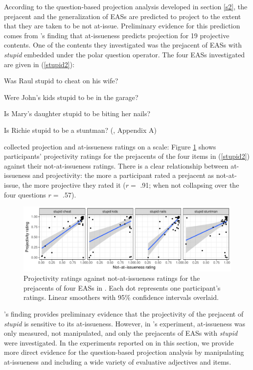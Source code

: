 \documentclass[11pt,fleqn]{article}
\newcommand{\6}{\mbox{$[\hspace*{-.6mm}[$}}
\newcommand{\9}{\mbox{$]\hspace*{-.6mm}]$}}
\newcommand{\citepos}[1]{\citeauthor{#1}'s \citeyear{#1}}
\begin{document}
According to the question-based projection analysis developed in section \ref{s2}, the prejacent and the generalization of EASs are predicted to project to the extent that they are taken to be not at-issue. Preliminary evidence for this prediction comes from \citepos{tbd-variability} finding that at-issueness predicts projection for 19 projective contents. One of the contents they investigated was the prejacent of EASs with {\em stupid} embedded under the polar question operator. The four EASs investigated are given in (\ref{stupid2}):

\begin{exe}
\ex\label{stupid2}

\begin{xlist}

\ex Was Raul stupid to cheat on his wife?

\ex Were John's kids stupid to be in the garage?

\ex Is Mary's daughter stupid to be biting her nails?

\ex Is Richie stupid to be a stuntman? \hfill (\citealt{tbd-variability}, Appendix A)

\end{xlist}

\end{exe}
\citet{tbd-variability} collected projection and at-issueness ratings on a scale: Figure \ref{f-corr} shows participants' projectivity ratings for the prejacents of the four items in (\ref{stupid2}) against their not-at-issueness ratings. There is a clear relationship between at-issueness and projectivity: the more a participant rated a prejacent as not-at-issue, the more projective they rated it ($r =$ .91; when not collapsing over the four questions $r =$ .57). 

\begin{figure}[h!]
\centering

\includegraphics[width=.95\textwidth]{figures/Exp1a-subject-projai-stupid}

\caption{Projectivity ratings against not-at-issueness ratings for the prejacents of four EASs in \citealt{tbd-variability}. Each dot represents one participant's ratings. Linear smoothers with 95\% confidence intervals overlaid.}
\label{f-corr}
\end{figure}
\citepos{tbd-variability} finding provides preliminary evidence that the projectivity of the prejacent of {\em stupid} is sensitive to its at-issueness. However, in \citepos{tbd-variability} experiment, at-issueness was only measured, not manipulated, and only the prejacents of EASs with {\em stupid} were investigated. In the experiments reported on in this section, we provide more direct evidence for the question-based projection analysis by manipulating at-issueness and including a wide variety of evaluative adjectives and items.
\end{document}
